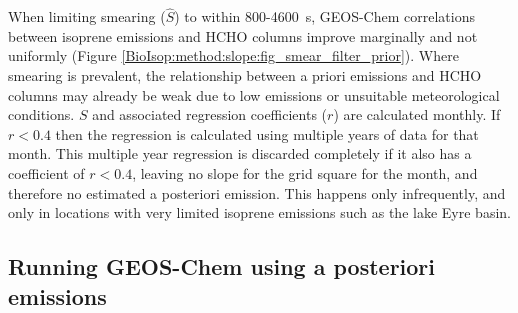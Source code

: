     
    
    When limiting smearing ($\hat{S}$) to within 800-4600~s, GEOS-Chem correlations between isoprene emissions and HCHO columns improve marginally and not uniformly (Figure \ref{BioIsop:method:slope:fig_smear_filter_prior}). 
    Where smearing is prevalent, the relationship between a priori emissions and HCHO columns may already be weak due to low emissions or unsuitable meteorological conditions.
    $S$ and associated regression coefficients ($r$) are calculated monthly.
    If $r<0.4$ then the regression is calculated using multiple years of data for that month.
    This multiple year regression is discarded completely if it also has a coefficient of $r<0.4$, leaving no slope for the grid square for the month, and therefore no estimated a posteriori emission.
    This happens only infrequently, and only in locations with very limited isoprene emissions such as the lake Eyre basin.
    
  \subsection{Running GEOS-Chem using a posteriori emissions}
  \label{BioIsop:method:scaled}
    

